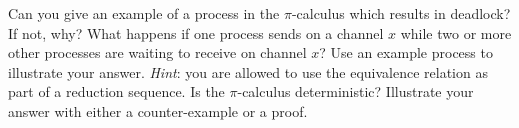 \documentclass[10pt,a4paper]{exam} %
\begin{document}
\begin{questions}
\question[1] Can you give an example of a process in the $\pi$-calculus which results in deadlock? If not, why? \droppoints
\question[2] What happens if one process sends on a channel $x$ while two or more other processes are waiting to receive on channel $x$? Use an example process to illustrate your answer. \emph{Hint}: you are allowed to use the equivalence relation as part of a reduction sequence. \droppoints
\question[2] Is the $\pi$-calculus deterministic? Illustrate your answer with either a counter-example or a proof. \droppoints 



\end{questions}
\end{document}
